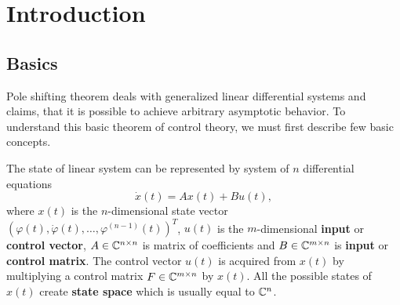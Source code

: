 \chapter{Introduction}
\label{chap:intr}

\section{Basics}
\label{sec:basics}

Pole shifting theorem deals with generalized linear differential systems and claims, that it is possible to achieve arbitrary asymptotic behavior. To understand this basic theorem of control theory, we must first describe few basic concepts.

The state of linear system can be represented by system of $n$ differential equations $$\dot{x}(t)=Ax(t)+Bu(t),$$ where $x(t)$ is the $n$-dimensional state vector $(\varphi(t),\dot{\varphi}(t),\ldots,\varphi^{(n-1)}(t))^T$, $u(t)$ is the $m$-dimensional \textbf{input} or \textbf{control vector}, $A \in \mathbb{C} ^{n\times n}$ is matrix of coefficients and $B\in \mathbb{C} ^{m\times n}$ is \textbf{input} or \textbf{control matrix}. The control vector $u(t)$ is acquired from $x(t)$ by multiplying a control matrix $F\in \mathbb{C} ^{m\times n}$ by $x(t)$. All the possible states of $x(t)$ create \textbf{state space} which is usually equal to $\mathbb{C}^n$. 

